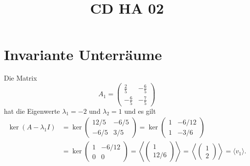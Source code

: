 \documentclass[a4paper]{article}
\title{CD HA 02}
\begin{document}
\section{Invariante Unterräume}
Die Matrix
$$A_1 = \begin{pmatrix}
\frac{2}{5} & -\frac{6}{5} \\
-\frac{6}{5} & -\frac{7}{5}
\end{pmatrix}$$
hat die Eigenwerte $λ_1 = -2$ und $λ_2 = 1$ und es gilt
\begin{align*}
\ker (A - λ_1 I) &= \ker \begin{pmatrix}
12/5 & -6/5 \\ -6/5 & 3/5
\end{pmatrix} = \ker \begin{pmatrix}
1 & -6/12 \\ 1 & -3/6
\end{pmatrix}\\
&=\ker\begin{pmatrix}
1 & -6/12\\
0 & 0
\end{pmatrix} = \left\langle \begin{pmatrix}
1 \\ 12/6
\end{pmatrix} \right\rangle  
= \left\langle \begin{pmatrix}
1 \\ 2
\end{pmatrix} \right\rangle = \langle v_1 \rangle.
\end{align*}
\end{document}
